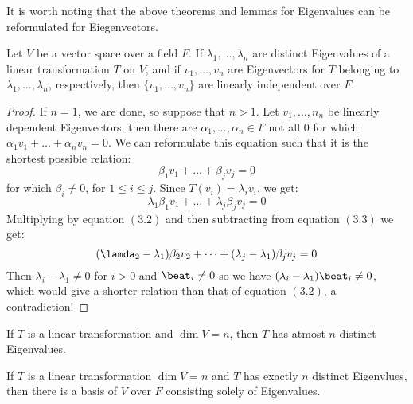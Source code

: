 It is worth noting that the above theorems and lemmas for Eigenvalues can be 
reformulated for Eiegenvectors.

\begin{theorem}\label{3.2.5}
    Let $V$ be a vector space over a field  $F$. If $\lambda_1, \dots, \lambda_n$ 
    are distinct Eigenvalues of a linear transformation $T$ on $V$, and if  $v_1, 
    \dots, v_n$ are Eigenvectors for $T$ belonging to  $\lambda_1, \dots,
    \lambda_n$, respectively, then  $\{v_1, \dots, v_n\}$ are linearly
    independent over $F$.
\end{theorem}
\begin{proof}
    If $n=1$, we are done, so suppose that  $n>1$. Let  $v_1, \dots, n_n$ be
    linearly dependent Eigenvectors, then there are $\alpha_1, \dots, \alpha_n
    \in F$ not all  $0$ for which  $\alpha_1v_1+\dots+\alpha_nv_n=0$. We can
    reformulate this equation such that it is the shortest possible relation:
        \begin{equation}
            \beta_1v_1+\dots+\beta_jv_j=0
        \end{equation}
    for which $\beta_i \neq 0$, for  $1 \leq i \leq j$. Since $T(v_i)=\lambda_iv_i$,
    we get:
        \begin{equation}
            \lambda_1\beta_1v_1+\dots+\lambda_j\beta_jv_j=0
        \end{equation} 
    Multiplying by equation $(3.2)$ and then subtracting from equation $(3.3)$ 
    we get:
        \begin{equation*}
            (\lamda_2-\lambda_1)\beta_2v_2+\dots+(\lambda_j-\lambda_1)\beta_jv_j=0
        \end{equation*}
    Then $\lambda_i-\lambda_1 \neq 0$ for $i > 0$ and  $\beat_i \neq 0$ so we
    have  $(\lambda_i-\lambda_1)\beat_i \neq 0$, which would give a shorter
    relation than that of equation $(3.2)$, a contradiction!
\end{proof}
\begin{corollary}
    If $T$ is a linear transformation and  $\dim{V}=n$, then $T$ has atmost  $n$
    distinct Eigenvalues.
\end{corollary}
\begin{corollary}
    If $T$ is a linear transformation $\dim{V}=n$ and $T$ has exactly  $n$
    distinct Eigenvlues, then there is a basis of  $V$ over  $F$ consisting
    solely of Eigenvalues.
\end{corollary}

